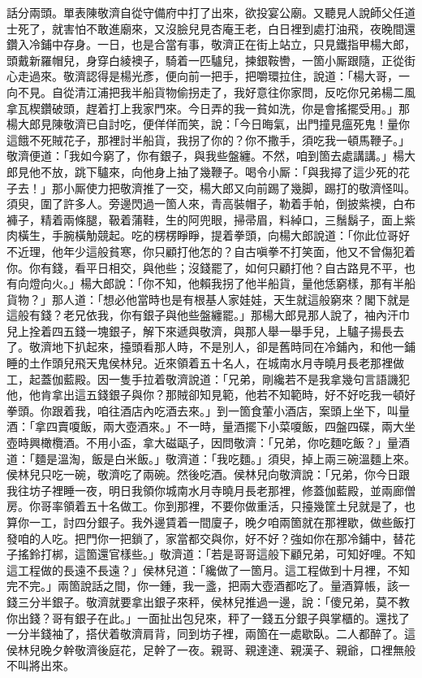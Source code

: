 話分兩頭。單表陳敬濟自從守備府中打了出來，欲投宴公廟。又聽見人說師父任道士死了，就害怕不敢進廟來，又沒臉兒見杏庵王老，白日裡到處打油飛，夜晚間還鑽入冷鋪中存身。一日，也是合當有事，敬濟正在街上站立，只見鐵指甲楊大郎，頭戴新羅帽兒，身穿白綾襖子，騎着一匹驢兒，揀銀鞍轡，一箇小厮跟隨，正從街心走過來。敬濟認得是楊光彥，便向前一把手，把嚼環拉住，說道：「楊大哥，一向不見。自從清江浦把我半船貨物偷拐走了，我好意往你家問，反吃你兄弟楊二風拿瓦楔鑽破頭，趕着打上我家門來。今日弄的我一貧如洗，你是會搖擺受用。」那楊大郎見陳敬濟已自討吃，便佯佯而笑，說：「今日晦氣，出門撞見瘟死鬼！量你這餓不死賊花子，那裡討半船貨，我拐了你的？你不撒手，須吃我一頓馬鞭子。」敬濟便道：「我如今窮了，你有銀子，與我些盤纏。不然，咱到箇去處講講。」楊大郎見他不放，跳下驢來，向他身上抽了幾鞭子。喝令小厮：「與我撏了這少死的花子去！」那小厮使力把敬濟推了一交，楊大郎又向前踢了幾脚，踢打的敬濟怪叫。須臾，圍了許多人。旁邊閃過一箇人來，青高裝帽子，勒着手帕，倒披紫襖，白布褲子，精着兩條腿，靸着蒲鞋，生的阿兜眼，掃帚眉，料綽口，三鬚鬍子，面上紫肉橫生，手腕橫觔競起。吃的楞楞睜睜，提着拳頭，向楊大郎說道：「你此位哥好不近理，他年少這般貧寒，你只顧打他怎的？{}自古嗔拳不打笑面，他又不曾傷犯着你。你有錢，看平日相交，與他些；沒錢罷了，如何只顧打他？自古路見不平，也有向燈向火。」楊大郎說：「你不知，他賴我拐了他半船貨，量他恁窮樣，那有半船貨物？」那人道：「想必他當時也是有根基人家娃娃，天生就這般窮來？閣下就是這般有錢？老兄依我，你有銀子與他些盤纏罷。」那楊大郎見那人說了，袖內汗巾兒上拴着四五錢一塊銀子，解下來遞與敬濟，與那人舉一舉手兒，上驢子揚長去了。敬濟地下扒起來，擡頭看那人時，不是別人，卻是舊時同在冷鋪內，和他一鋪睡的土作頭兒飛天鬼侯林兒。近來領着五十名人，在城南水月寺曉月長老那裡做工，起蓋伽藍殿。因一隻手拉着敬濟說道：「兄弟，剛纔若不是我拿幾句言語譏犯他，他肯拿出這五錢銀子與你？那賊卻知見範，他若不知範時，好不好吃我一頓好拳頭。你跟着我，咱往酒店內吃酒去來。」到一箇食葷小酒店，案頭上坐下，叫量酒：「拿四賣嗄飯，兩大壺酒來。」不一時，量酒擺下小菜嗄飯，四盤四碟，兩大坐壺時興橄欖酒。不用小盃，拿大磁甌子，因問敬濟：「兄弟，你吃麵吃飯？」量酒道：「麵是溫淘，飯是白米飯。」敬濟道：「我吃麵。」須臾，掉上兩三碗溫麵上來。侯林兒只吃一碗，敬濟吃了兩碗。然後吃酒。侯林兒向敬濟說：「兄弟，你今日跟我往坊子裡睡一夜，{}明日我領你城南水月寺曉月長老那裡，修蓋伽藍殿，並兩廊僧房。你哥率領着五十名做工。你到那裡，不要你做重活，只擡幾筐土兒就是了，也算你一工，討四分銀子。我外邊賃着一間廈子，晚夕咱兩箇就在那裡歇，{}做些飯打發咱的人吃。把門你一把鎖了，家當都交與你，{}好不好？強如你在那冷鋪中，替花子搖鈴打梆，這箇還官樣些。」敬濟道：「若是哥哥這般下顧兄弟，可知好哩。不知這工程做的長遠不長遠？」侯林兒道：「纔做了一箇月。這工程做到十月裡，不知完不完。」兩箇說話之間，你一鍾，我一盞，把兩大壺酒都吃了。量酒算帳，該一錢三分半銀子。敬濟就要拿出銀子來秤，侯林兒推過一邊，說：「傻兄弟，莫不教你出錢？哥有銀子在此。」一面扯出包兒來，秤了一錢五分銀子與掌櫃的。還找了一分半錢袖了，搭伏着敬濟肩背，同到坊子裡，兩箇在一處歇臥。二人都醉了。這侯林兒晚夕幹敬濟後庭花，足幹了一夜。親哥、親達達、親漢子、親爺，口裡無般不叫將出來。

